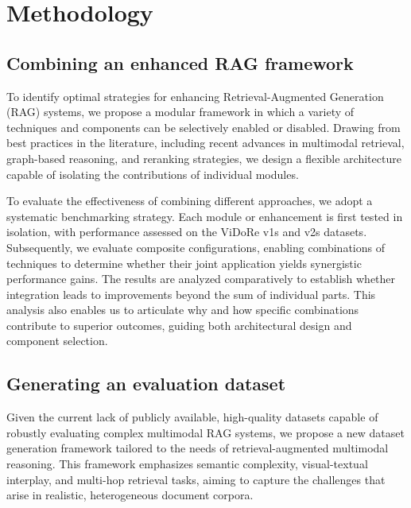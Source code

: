 \documentclass[12pt,twoside]{report}
\begin{document}
\chapter{Methodology}
\section{Combining an enhanced RAG framework}
To identify optimal strategies for enhancing Retrieval-Augmented Generation (RAG) systems, we propose a modular framework in which a variety of techniques and components can be selectively enabled or disabled. Drawing from best practices in the literature, including recent advances in multimodal retrieval, graph-based reasoning, and reranking strategies, we design a flexible architecture capable of isolating the contributions of individual modules.


To evaluate the effectiveness of combining different approaches, we adopt a systematic benchmarking strategy. Each module or enhancement is first tested in isolation, with performance assessed on the ViDoRe\cite{ColPali} v1s and v2s datasets. Subsequently, we evaluate composite configurations, enabling combinations of techniques to determine whether their joint application yields synergistic performance gains. The results are analyzed comparatively to establish whether integration leads to improvements beyond the sum of individual parts. This analysis also enables us to articulate why and how specific combinations contribute to superior outcomes, guiding both architectural design and component selection.

\section{Generating an evaluation dataset}
Given the current lack of publicly available, high-quality datasets capable of robustly evaluating complex multimodal RAG systems, we propose a new dataset generation framework tailored to the needs of retrieval-augmented multimodal reasoning. This framework emphasizes semantic complexity, visual-textual interplay, and multi-hop retrieval tasks, aiming to capture the challenges that arise in realistic, heterogeneous document corpora.
\end{document}
